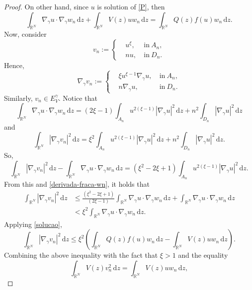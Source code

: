 \documentclass[10pt,a4paper]{amsart}
\newcommand{\R}{\mathbb{R}}
\begin{document}
\begin{proof}
On other hand, since $u$ is solution of \eqref{P}, then
\begin{equation}\label{solucao}
		\int_{\mathbb{R}^N}\nabla_\gamma u \cdot\nabla_\gamma w_n\,\mathrm{d}z + \int_{\mathbb{R}^N}V(z)uw_n\,\mathrm{d}z 		= \int_{\R^N}Q(z)f(u)w_n\,\mathrm{d}z 	.
	\end{equation}
    Now, consider
	$$
	v_n:=\left\{
	\begin{aligned}
		& u^{\xi} ,\ &\mbox{in} \ A_n, \\
		&nu, \ &\mbox{in} \ D_n.
	\end{aligned}
	\right.
	$$
	Hence, 
	$$
	\nabla_\gamma v_n:=\left\{
	\begin{aligned}
		& \xi u^{\xi-1}\nabla_\gamma u ,\ &\mbox{in} \ A_n, \\
		&n\nabla_\gamma u, \ &\mbox{in} \ D_n.
	\end{aligned}
	\right.
	$$
	Similarly, $v_n \in E_V^\gamma$. Notice that
	\begin{equation}\label{derivada-fraca-wn}
		\int_{\mathbb{R}^N}\nabla_\gamma u \cdot \nabla_\gamma w_n\,\mathrm{d}z = (2\xi-1)\int_{A_n}u^{2(\xi-1)}|\nabla_{\gamma} u|^2\,\mathrm{d}z + n^2\int_{D_n}|\nabla_\gamma u|^2\,\mathrm{d}z
	\end{equation}
	and
    $$
	\int_{\mathbb{R}^N}|\nabla_{\gamma} v_n|^2\,\mathrm{d}z = \xi^2\int_{A_n}u^{2(\xi-1)}|\nabla_{\gamma} u|^2\,\mathrm{d}z + n^2\int_{D_n}|\nabla_\gamma u|^2\,\mathrm{d}z.
	$$
So,
	$$
	\int_{\mathbb{R}^N}|\nabla_{\gamma} v_n|^2\,\mathrm{d}z - \int_{\mathbb{R}^N}\nabla_\gamma u \cdot \nabla_\gamma w_n\,\mathrm{d}z = (\xi^2-2\xi+1)\int_{A_n}u^{2(\xi-1)}|\nabla_{\gamma} u|^2\,\mathrm{d}z.
	$$
From this and \eqref{derivada-fraca-wn}, it holds that
	$$
	\begin{aligned}
		\int_{\mathbb{R}^N}|\nabla_{\gamma} v_n|^2\,\mathrm{d}z &\leq \frac{(\xi^2-2\xi+1)}{(2\xi-1)}\int_{\mathbb{R}^N}\nabla_\gamma u \cdot \nabla_\gamma  w_n\,\mathrm{d}z + \int_{\mathbb{R}^N}\nabla_\gamma u \cdot \nabla_\gamma w_n\,\mathrm{d}z
		\\
		& < \xi^2\int_{\mathbb{R}^N}\nabla_\gamma u \cdot \nabla_\gamma w_n\,\mathrm{d}z.
	\end{aligned}
	$$
Applying \eqref{solucao},
    $$
	\int_{\mathbb{R}^N}|\nabla_{\gamma} v_n|^2\,\mathrm{d}z \leq \xi^2\left(	 \int_{\R^N}Q(z)f(u)w_n\,\mathrm{d}z - \int_{\mathbb{R}^N}V(z)uw_n\,\mathrm{d}z 	\right).
	$$	
Combining the above inequality with the fact that $\xi>1$ and the equality
	$$
	\int_{\mathbb{R}^N}V(z)v_n^2\,\mathrm{d}z = \int_{\mathbb{R}^N}V(z)uw_n\,\mathrm{d}z,
$$
\end{proof}
\end{document}
